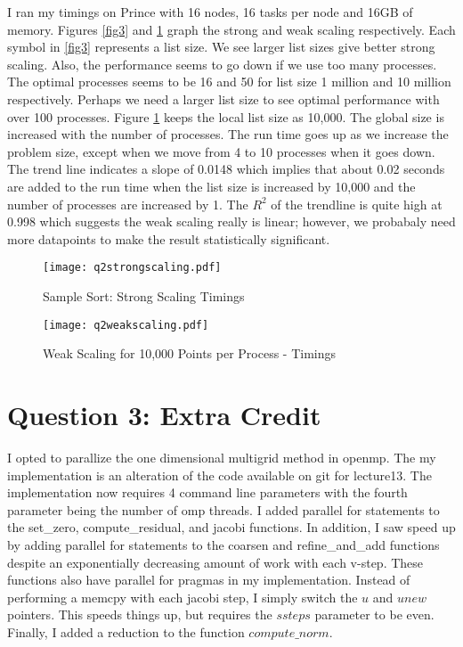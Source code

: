 \documentclass[10pt]{article}
\begin{document}
I ran my timings on Prince with 16 nodes, 16 tasks per node and 16GB of memory. Figures \ref{fig3} and \ref{fig4} graph the strong and weak scaling respectively. Each symbol in \ref{fig3} represents a list size. We see larger list sizes give better strong scaling. Also, the performance seems to go down if we use too many processes. The optimal processes seems to be 16 and 50 for list size 1 million and 10 million respectively. Perhaps we need a larger list size to see optimal performance with over 100 processes. Figure \ref{fig4} keeps the local list size as 10,000. The global size is increased with the number of processes. The run time goes up as we increase the problem size, except when we move from 4 to 10 processes when it goes down. The trend line indicates a slope of 0.0148 which implies that about 0.02 seconds are added to the run time when the list size is increased by 10,000 and the number of processes are increased by 1. The $R^2$ of the trendline is quite high at 0.998 which suggests the weak scaling really is linear; however, we probabaly need more datapoints to make the result statistically significant.

\lipsum

\begin{figure}[!h]
    \centering
    \begin{minipage}{0.45\textwidth}
        \centering
        \texttt{[image: q2strongscaling.pdf]} %
        \caption{Sample Sort: Strong Scaling Timings}
        \label{fig3}
    \end{minipage}\hfill
         \begin{minipage}{0.45\textwidth}
        \centering
        \texttt{[image: q2weakscaling.pdf]} %
        \caption{Weak Scaling for 10,000 Points per Process - Timings}
        \label{fig4}
    \end{minipage}
\end{figure}

\lipsum


\section{Question 3: Extra Credit}

I opted to parallize the one dimensional multigrid method in openmp. The my implementation is an alteration of the code available on git for lecture13. The implementation now requires 4 command line parameters with the fourth parameter being the number of omp threads. I added parallel for statements to the set\_zero, compute\_residual, and jacobi functions. In addition, I saw speed up by adding parallel for statements to the coarsen and refine\_and\_add functions despite an exponentially decreasing amount of work with each v-step. These functions also have parallel for pragmas in my implementation. Instead of performing a memcpy with each jacobi step, I simply switch the $u$ and $unew$ pointers. This speeds things up, but requires the $ssteps$ parameter to be even. Finally, I added a reduction to the function $compute\_norm$.\\
\end{document}
